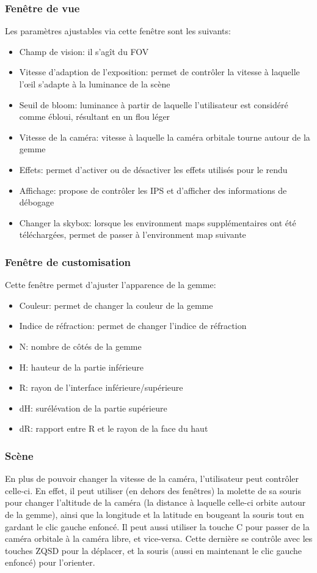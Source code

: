\documentclass[a4paper,12pt]{article}
\begin{document}
\subsubsection{Fenêtre de vue}
Les paramètres ajustables via cette fenêtre sont les suivants:
\begin{itemize}
    \item Champ de vision: il s'agît du FOV
    \item Vitesse d'adaption de l'exposition: permet de contrôler la vitesse à laquelle l'œil s'adapte à la luminance de la scène
    \item Seuil de bloom: luminance à partir de laquelle l'utilisateur est considéré comme ébloui, résultant en un flou léger
    \item Vitesse de la caméra: vitesse à laquelle la caméra orbitale tourne autour de la gemme
    \item Effets: permet d'activer ou de désactiver les effets utilisés pour le rendu
    \item Affichage: propose de contrôler les IPS et d'afficher des informations de débogage
    \item Changer la skybox: lorsque les environment maps supplémentaires ont été téléchargées, permet de passer à l'environment map suivante
\end{itemize}

\subsubsection{Fenêtre de customisation}
Cette fenêtre permet d'ajuster l'apparence de la gemme:
\begin{itemize}
    \item Couleur: permet de changer la couleur de la gemme
    \item Indice de réfraction: permet de changer l'indice de réfraction
    \item N: nombre de côtés de la gemme
    \item H: hauteur de la partie inférieure
    \item R: rayon de l'interface inférieure/supérieure
    \item dH: surélévation de la partie supérieure
    \item dR: rapport entre R et le rayon de la face du haut
\end{itemize}

\subsubsection{Scène}
En plus de pouvoir changer la vitesse de la caméra, l'utilisateur peut contrôler celle-ci. En effet,
il peut utiliser (en dehors des fenêtres) la molette de sa souris pour changer l'altitude de la caméra
(la distance à laquelle celle-ci orbite autour de la gemme), ainsi que la longitude et la latitude
en bougeant la souris tout en gardant le clic gauche enfoncé. Il peut aussi utiliser la touche C pour
passer de la caméra orbitale à la caméra libre, et vice-versa. Cette dernière se contrôle avec les
touches ZQSD pour la déplacer, et la souris (aussi en maintenant le clic gauche enfoncé)
pour l'orienter.
\end{document}
